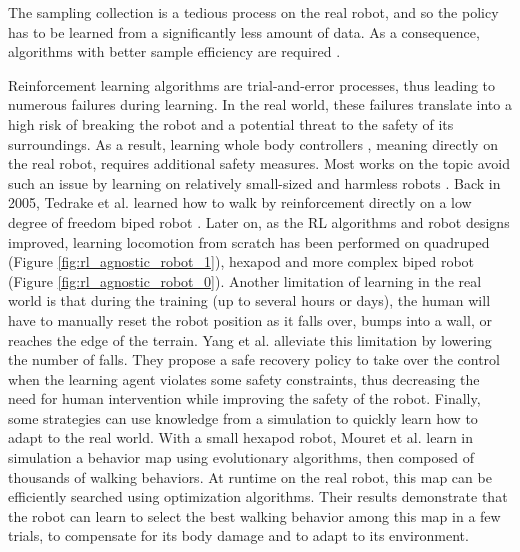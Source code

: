 The sampling collection is a tedious process on the real robot, and so the policy has to be learned from a significantly less amount of data. As a consequence, algorithms with better sample efficiency are required \cite{sergey_2018, calinon_micro_rl}.

Reinforcement learning algorithms are trial-and-error processes, thus leading to numerous failures during learning. 
In the real world, these failures translate into a high risk of breaking the robot and a potential threat to the safety of its surroundings.
As a result, learning whole body controllers  \cite{rl_wild_heess_2022}, meaning directly on the real robot, requires additional safety measures.
Most works on the topic avoid such an issue by learning on relatively small-sized and harmless robots \cite{nao_rl_world_docking, rl_wild_heess_2022}. 
Back in 2005, Tedrake et al. learned how to walk by reinforcement directly on a low degree of freedom biped robot \cite{tedrake2005learning}. 
Later on, as the RL algorithms and robot designs improved, learning locomotion from scratch has been performed on quadruped \cite{sergey_2018} (Figure \ref{fig:rl_agnostic_robot_1}), hexapod \cite{deepmind_locomotion_RL} and more complex biped robot \cite{rl_wild_heess_2022} (Figure \ref{fig:rl_agnostic_robot_0}).
Another limitation of learning in the real world is that during the training (up to several hours or days), the human will have to manually reset the robot position as it falls over, bumps into a wall, or reaches the edge of the terrain.
Yang et al. \cite{yang2022safe} alleviate this limitation by lowering the number of falls. They propose a safe recovery policy to take over the control when the learning agent violates some safety constraints, thus decreasing the need for human intervention while improving the safety of the robot.
Finally, some strategies can use knowledge from a simulation to quickly learn how to adapt to the real world.
With a small hexapod robot, Mouret et al. \cite{Mouret_adapt_like_animals_2014} learn in simulation a behavior map using evolutionary algorithms, then composed of thousands of walking behaviors. At runtime on the real robot, this map can be efficiently searched using optimization algorithms. 
Their results demonstrate that the robot can learn to select the best walking behavior among this map in a few trials, to compensate for its body damage and to adapt to its environment.


